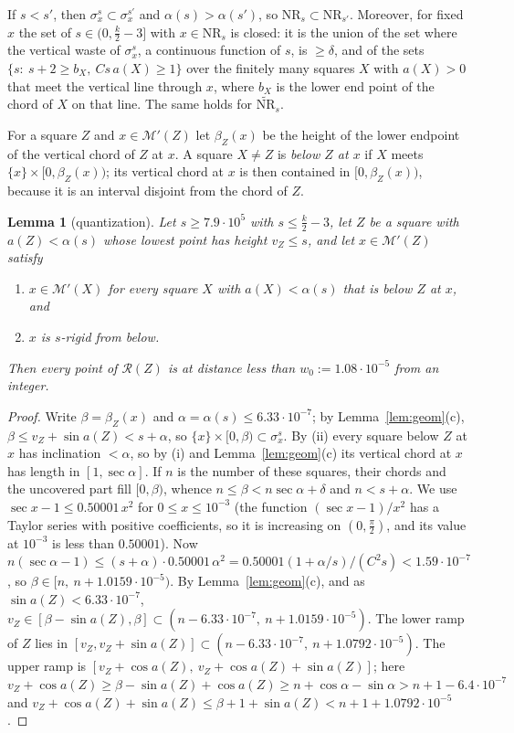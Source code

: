 \documentclass[11pt]{amsart}
\newtheorem{lemma}[theorem]{Lemma}
\theoremstyle{definition}
\theoremstyle{remark}
\begin{document}
If $s<s'$, then $\sigma^s_x\subset\sigma^{s'}_x$ and $\alpha(s)>\alpha(s')$, so $\mathrm{NR}_s\subset\mathrm{NR}_{s'}$. Moreover, for fixed $x$
the set of $s\in(0,\frac k2-3]$ with $x\in\mathrm{NR}_s$ is closed: it is the union of the set where the vertical waste of
$\sigma^s_x$, a continuous function of $s$, is $\ge\delta$, and of the sets $\{s:\ s+2\ge b_X,\ Cs\,a(X)\ge1\}$ over the finitely many
squares $X$ with $a(X)>0$ that meet the vertical line through $x$, where $b_X$ is the lower end point of the chord of $X$ on
that line. The same holds for $\widetilde{\mathrm{NR}}_s$.

For a square $Z$ and $x\in\mathcal M'(Z)$ let $\beta_Z(x)$ be the height of the lower endpoint of the vertical chord of
$Z$ at $x$. A square $X\ne Z$ is \emph{below $Z$ at $x$} if $X$ meets $\{x\}\times[0,\beta_Z(x))$; its vertical chord at
$x$ is then contained in $[0,\beta_Z(x))$, because it is an interval disjoint from the chord of $Z$.

\begin{lemma}[quantization]\label{lem:Q}
Let $s\ge7.9\cdot10^5$ with $s\le\frac k2-3$, let $Z$ be a square with $a(Z)<\alpha(s)$ whose lowest point has height
$v_Z\le s$, and let $x\in\mathcal M'(Z)$ satisfy
\begin{enumerate}[label=(\roman*)]
\item $x\in\mathcal M'(X)$ for every square $X$ with $a(X)<\alpha(s)$ that is below $Z$ at $x$, and
\item $x$ is $s$-rigid from below.
\end{enumerate}
Then every point of $\mathcal R(Z)$ is at distance less than $w_0:=1.08\cdot10^{-5}$ from an integer.
\end{lemma}

\begin{proof}
Write $\beta=\beta_Z(x)$ and $\alpha=\alpha(s)\le6.33\cdot10^{-7}$; by Lemma~\ref{lem:geom}(c), $\beta\le v_Z+\sin a(Z)<s+\alpha$,
so $\{x\}\times[0,\beta)\subset\sigma^s_x$. By (ii) every square below $Z$ at $x$ has inclination $<\alpha$, so by (i) and
Lemma~\ref{lem:geom}(c) its vertical chord at $x$ has length in $[1,\sec\alpha]$. If $n$ is the number of these squares,
their chords and the uncovered part fill $[0,\beta)$, whence $n\le\beta<n\sec\alpha+\delta$ and $n<s+\alpha$. We use
$\sec x-1\le0.50001\,x^2$ for $0\le x\le10^{-3}$ (the function $(\sec x-1)/x^2$ has a Taylor series with positive coefficients, so it is
increasing on $(0,\frac\pi2)$, and its value at $10^{-3}$ is less than $0.50001$). Now
$n(\sec\alpha-1)\le(s+\alpha)\cdot0.50001\,\alpha^2=0.50001(1+\alpha/s)/(C^2s)<1.59\cdot10^{-7}$, so $\beta\in[n,\ n+1.0159\cdot10^{-5})$. By
Lemma~\ref{lem:geom}(c), and as $\sin a(Z)<6.33\cdot10^{-7}$, $v_Z\in[\beta-\sin a(Z),\beta]\subset(n-6.33\cdot10^{-7},\ n+1.0159\cdot10^{-5})$.
The lower ramp of $Z$ lies in $[v_Z,v_Z+\sin a(Z)]\subset(n-6.33\cdot10^{-7},\ n+1.0792\cdot10^{-5})$. The upper ramp is
$[v_Z+\cos a(Z),\ v_Z+\cos a(Z)+\sin a(Z)]$; here $v_Z+\cos a(Z)\ge\beta-\sin a(Z)+\cos a(Z)\ge n+\cos\alpha-\sin\alpha
>n+1-6.4\cdot10^{-7}$ and $v_Z+\cos a(Z)+\sin a(Z)\le\beta+1+\sin a(Z)<n+1+1.0792\cdot10^{-5}$.
\end{proof}
\end{document}

